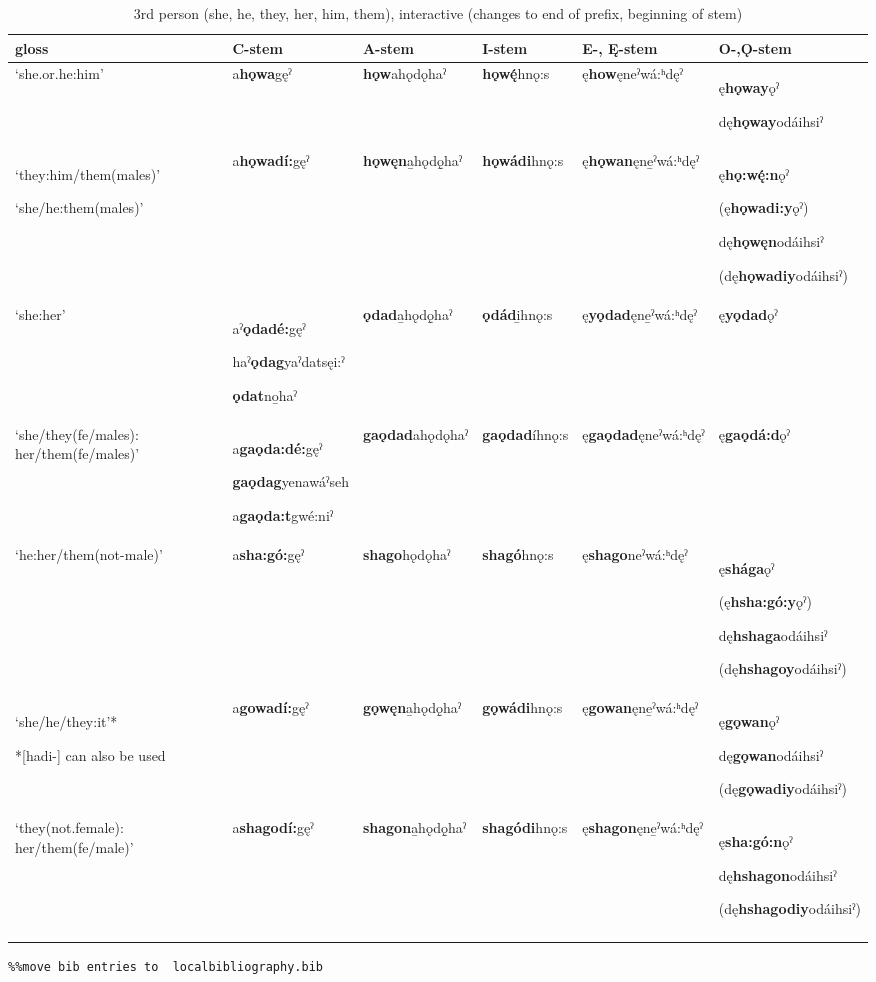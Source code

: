 \begin{table}
\caption{3rd person (she, he, they, her, him, them), interactive (changes to end of prefix, beginning of stem)}
\label{tab:1:33pron2}
\tiny{
\begin{tabularx}{\textwidth}{XXXXXX}
\lsptoprule
gloss & C-stem & A-stem & I-stem & E-, Ę{}-stem & O-,Ǫ{}-stem\\
\midrule
‘she.or.he:him’ & a\textbf{hǫwa}gęˀ & \textbf{hǫw}ahǫdǫhaˀ & \textbf{hǫw\'{ę}}hnǫ:s & ę\textbf{how}ęneˀwá:ʰdęˀ & ę\textbf{hǫway}ǫˀ

dę\textbf{hǫway}odáihsiˀ\\
‘they:him/them(males)’

‘she/he:them(males)’ & a\textbf{hǫwadí:}gęˀ & \textbf{hǫwęn}a̱hǫdǫ̱haˀ & \textbf{hǫwádi}hnǫ:s & ę\textbf{hǫwan}ęne̱ˀwá:ʰdęˀ & ę\textbf{hǫ:w\'{ę}:n}ǫˀ 

(ę\textbf{hǫwadi:y}ǫˀ)

dę\textbf{hǫwęn}odáihsiˀ

(dę\textbf{hǫwadiy}odáihsiˀ)\\
‘she:her’ & aˀ\textbf{ǫdadé:}gęˀ

haˀ\textbf{ǫdag}yaˀdatsęi:ˀ

\textbf{ǫdat}no̱haˀ & \textbf{ǫdad}a̱hǫdǫ̱haˀ & \textbf{ǫdád}i̱hnǫ:s & ę\textbf{yǫdad}ęne̱ˀwá:ʰdęˀ & ę\textbf{yǫdad}ǫˀ\\
‘she/they(fe/males):
her/them(fe/males)’ & a\textbf{gaǫda:dé:}gęˀ

\textbf{gaǫdag}yenawáˀseh

a\textbf{gaǫda:t}gwé:niˀ & \textbf{gaǫdad}ahǫdǫhaˀ & \textbf{gaǫdad}íhnǫ:s & ę\textbf{gaǫdad}ęneˀwá:ʰdęˀ & ę\textbf{gaǫdá:d}ǫˀ\\
‘he:her/them(not-male)’ & a\textbf{sha:gó:}gęˀ & \textbf{shago}hǫdǫhaˀ & \textbf{shagó}hnǫ:s & ę\textbf{shago}neˀwá:ʰdęˀ & ę\textbf{shága}ǫˀ

(ę\textbf{hsha:gó:y}ǫˀ)

dę\textbf{hshaga}odáihsiˀ 

(dę\textbf{hshagoy}odáihsiˀ)\\
‘she/he/they:it’*

*[hadi-] can also be used & a\textbf{gowadí:}gęˀ & \textbf{gǫwęn}a̱hǫdǫ̱haˀ & \textbf{gǫwádi}hnǫ:s & ę\textbf{gowan}ęne̱ˀwá:ʰdęˀ & ę\textbf{gǫwan}ǫˀ

dę\textbf{gǫwan}odáihsiˀ

(dę\textbf{gǫwadiy}odáihsiˀ)\\
‘they(not.female):
her/them(fe/male)’ & a\textbf{shagodí:}gęˀ & \textbf{shagon}a̱hǫdǫ̱haˀ & \textbf{shagódi}hnǫ:s & ę\textbf{shagon}ęne̱ˀwá:ʰdęˀ & ę\textbf{sha:gó:n}ǫˀ

dę\textbf{hshagon}odáihsiˀ

(dę\textbf{hshagodiy}odáihsiˀ)\\
\lspbottomrule
\end{tabularx}}
\end{table}

\begin{verbatim}%%move bib entries to  localbibliography.bib
\end{verbatim} 